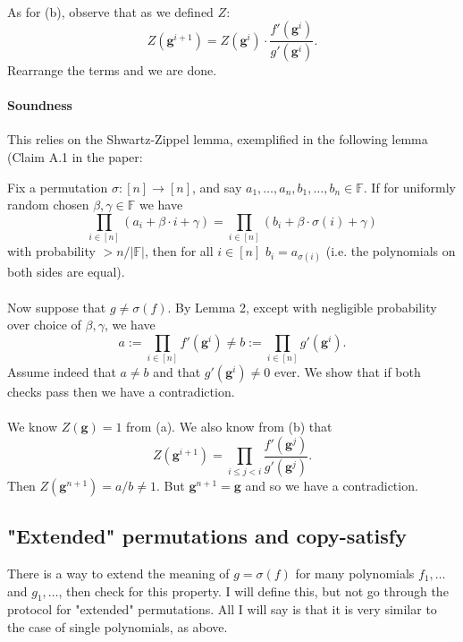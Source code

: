 \documentclass[11pt]{article}
\newcommand{\field}{\mathbb{F}}
\newcommand{\gen}{\mathbf{g}}
\begin{document}
\paragraph{} As for (b), observe that as we defined $Z$:
\[ Z(\gen^{i + 1}) = Z(\gen^i) \cdot \frac{f'(\gen^i)}{g'(\gen^i)}. \]
Rearrange the terms and we are done.

\paragraph{Soundness} This relies on the Shwartz-Zippel lemma, exemplified in the following lemma (Claim A.1 in the paper:

\begin{lemma}
    Fix a permutation $\sigma: [n] \rightarrow [n]$, and say $a_1, \ldots, a_n, b_1, \ldots, b_n \in \field{}$. If for uniformly random chosen $\beta, \gamma \in \field{}$ we have
    \[ \prod_{i \in [n]} (a_i + \beta \cdot i + \gamma) = \prod_{i \in [n]} (b_i + \beta \cdot \sigma(i) + \gamma) \]
    with probability $> n / |\field{}|$, then for all $i \in [n]$ $b_i = a_{\sigma(i)}$ (i.e. the polynomials on both sides are equal).
\end{lemma}

\paragraph{} Now suppose that $g \neq \sigma(f)$. By Lemma 2, except with negligible probability over choice of $\beta, \gamma$, we have
\[ a := \prod_{i \in [n]} f'(\gen^i) \neq b := \prod_{i \in [n]} g'(\gen^i). \]
Assume indeed that $a \neq b$ and that $g'(\gen^i) \neq 0$ ever. We show that if both checks pass then we have a contradiction.

\paragraph{} We know $Z(\gen) = 1$ from (a). We also know from (b) that 
\[ Z(\gen^{i + 1}) = \prod_{i \leq j < i} \frac{f'(\gen^j)}{g'(\gen^j)}. \]
Then $Z(\gen^{n + 1}) = a / b \neq 1$. But $\gen^{n + 1} = \gen{}$ and so we have a contradiction.

\subsection{"Extended" permutations and copy-satisfy}
There is a way to extend the meaning of $g = \sigma(f)$ for many polynomials $f_1, \ldots$ and $g_1, \ldots$, then check for this property. I will define this, but not go through the protocol for "extended" permutations. All I will say is that it is very similar to the case of single polynomials, as above.
\end{document}
